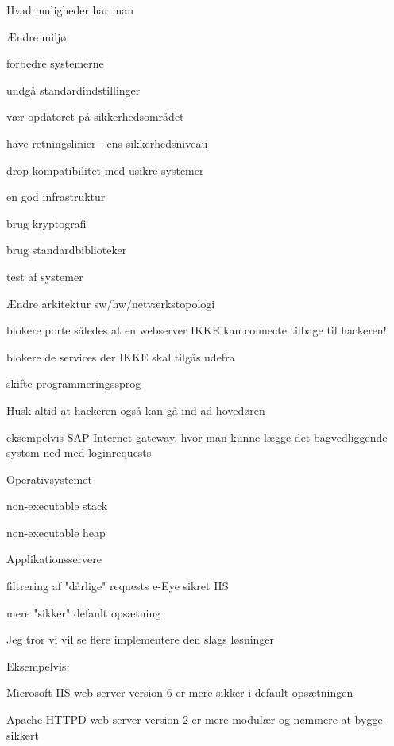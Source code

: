 \documentclass[Screen16to9,17pt]{foils}
\begin{document}
\begin{list1}
\item Hvad muligheder har man
  \begin{list2}
  \item Ændre miljø
  \item forbedre systemerne
  \item undgå standardindstillinger
  \item vær opdateret på sikkerhedsområdet
  \item have retningslinier - ens sikkerhedsniveau
  \item drop kompatibilitet med usikre systemer
  \item en god infrastruktur
  \item brug kryptografi
  \item brug standardbiblioteker
  \item test af systemer
  \end{list2}
\end{list1}


\begin{list1}
\item Ændre arkitektur sw/hw/netværkstopologi
  \begin{list2}
  \item blokere porte således at en webserver IKKE kan connecte tilbage til hackeren!
  \item blokere de services der IKKE skal tilgås udefra
  \item skifte programmeringssprog
  \end{list2}
\item Husk altid at hackeren også kan gå ind ad hovedøren
\item eksempelvis SAP Internet gateway, hvor man kunne lægge det
  bagvedliggende system ned med loginrequests
\end{list1}

\begin{list1}
\item Operativsystemet
  \begin{list2}
  \item non-executable stack
  \item non-executable heap
  \end{list2}
\item Applikationsservere
  \begin{list2}
  \item filtrering af "dårlige" requests e-Eye sikret IIS
  \item mere "sikker" default opsætning
  \end{list2}
\item Jeg tror vi vil se flere implementere den slags løsninger
\item Eksempelvis:
\begin{list2}
\item Microsoft IIS web server version 6 er mere sikker i default opsætningen
\item Apache HTTPD web server version 2 er mere modulær og nemmere at bygge sikkert
\end{list2}
\end{list1}
\end{document}
